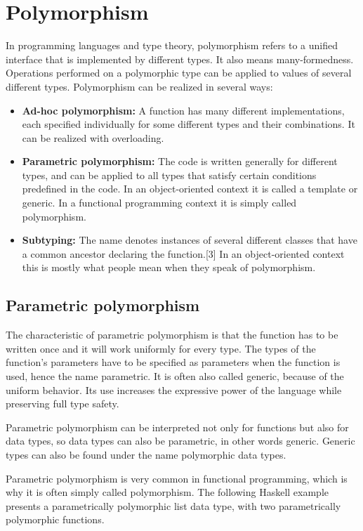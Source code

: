\documentclass[margin=0px]{article}
\begin{document}
\section{Polymorphism}
In programming languages and type theory, polymorphism refers to a unified interface that is implemented by different types. It also means many-formedness. Operations performed on a polymorphic type can be applied to values of several different types. Polymorphism can be realized in several ways:
\begin{itemize}
    \item {\textbf {Ad-hoc polymorphism:}} A function has many different implementations, each specified individually for some different types and their combinations. It can be realized with overloading.
    \item {\textbf {Parametric polymorphism:}} The code is written generally for different types, and can be applied to all types that satisfy certain conditions predefined in the code. In an object-oriented context it is called a template or generic. In a functional programming context it is simply called polymorphism.
    \item {\textbf {Subtyping:}} The name denotes instances of several different classes that have a common ancestor declaring the function.[3] In an object-oriented context this is mostly what people mean when they speak of polymorphism.
\end{itemize}

\subsection{Parametric polymorphism}
The characteristic of parametric polymorphism is that the function has to be written once and it will work uniformly for every type. The types of the function's parameters have to be specified as parameters when the function is used, hence the name parametric. It is often also called generic, because of the uniform behavior. Its use increases the expressive power of the language while preserving full type safety.

Parametric polymorphism can be interpreted not only for functions but also for data types, so data types can also be parametric, in other words generic. Generic types can also be found under the name polymorphic data types.

Parametric polymorphism is very common in functional programming, which is why it is often simply called polymorphism. The following Haskell example presents a parametrically polymorphic list data type, with two parametrically polymorphic functions.
\end{document}

